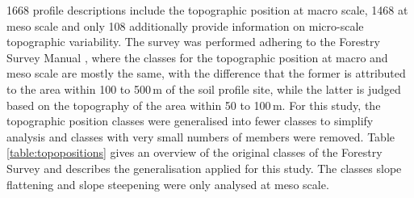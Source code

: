 \documentclass[preprint,12pt,authoryear]{elsarticle}
\begin{document}
1668 profile descriptions include  the topographic position at macro scale, 1468 at meso scale and only 108 additionally provide information on micro-scale topographic variability. The survey was performed adhering to the Forestry Survey Manual \citep{Englisch1998}, where the classes for the topographic position at macro and meso scale are mostly the same, with the difference that the former is attributed to the area within 100 to 500\,m of the soil profile site, while the latter is judged based on the topography of the area within 50 to 100\,m. For this study, the topographic position classes were generalised into fewer classes to simplify  analysis and classes with very small numbers of members were removed. Table\,\ref{table:topopositions} gives an overview of the original classes of the Forestry Survey and describes the generalisation applied for this study. The classes slope flattening and slope steepening were only analysed at meso scale.
\end{document}
